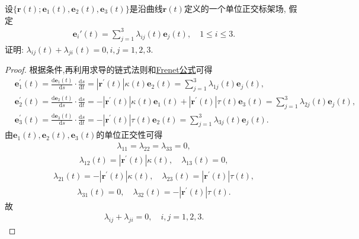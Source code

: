 \documentclass[../../main.tex]{subfiles}%
\begin{document}
\begin{example}
设$\{\bm{r}(t); \bm{e}_1(t), \bm{e}_2(t), \bm{e}_3(t)\}$是沿曲线$\bm{r}(t)$定义的一个单位正交标架场, 假定
\begin{align*}
\bm{e}_i'(t) = \sum\limits_{j=1}^{3} \lambda_{ij}(t) \bm{e}_j(t),\quad 1 \leqslant i \leqslant 3.
\end{align*}
证明: $\lambda_{ij}(t) + \lambda_{ji}(t) = 0, i,j = 1,2,3.$
\end{example}
\begin{proof}

根据条件,再利用求导的链式法则和\hyperref[theorem:微分几何-Frenet公式]{Frenet公式}可得
\begin{align*}
&\bm{e}_{1}^{\prime}\left( t \right) =\frac{\mathrm{d}\bm{e}_1\left( t \right)}{\mathrm{d}s}\cdot \frac{\mathrm{d}s}{\mathrm{d}t}=\left| \bm{r}^\prime \left( t \right) \right|\kappa \left( t \right) \bm{e}_2\left( t \right) =\sum_{j=1}^3{\lambda _{1j}\left( t \right) \bm{e}_j\left( t \right)},
\\
&\bm{e}_{2}^{\prime}\left( t \right) =\frac{\mathrm{d}\bm{e}_2\left( t \right)}{\mathrm{d}s}\cdot \frac{\mathrm{d}s}{\mathrm{d}t}=-\left| \bm{r}^\prime \left( t \right) \right|\kappa \left( t \right) \bm{e}_1\left( t \right) +\left| \bm{r}^\prime \left( t \right) \right|\tau \left( t \right) \bm{e}_3\left( t \right) =\sum_{j=1}^3{\lambda _{2j}\left( t \right) \bm{e}_j\left( t \right)},
\\
&\bm{e}_{3}^{\prime}\left( t \right) =\frac{\mathrm{d}\bm{e}_3\left( t \right)}{\mathrm{d}s}\cdot \frac{\mathrm{d}s}{\mathrm{d}t}=-\left| \bm{r}^\prime \left( t \right) \right|\tau \left( t \right) \bm{e}_2\left( t \right) =\sum_{j=1}^3{\lambda _{3j}\left( t \right) \bm{e}_j\left( t \right)}.
\end{align*}
由$\bm{e}_1\left( t \right) ,\bm{e}_2\left( t \right) ,\bm{e}_3\left( t \right)$的单位正交性可得
\begin{align*}
\lambda_{11}=\lambda_{22}=\lambda_{33}=0,
\end{align*}
\begin{align*}
\lambda _{12}\left( t \right) =\left| \bm{r}^\prime \left( t \right) \right|\kappa \left( t \right) ,\quad \lambda _{13}\left( t \right) =0,
\end{align*}
\begin{align*}
\lambda _{21}\left( t \right) =-\left| \bm{r}^\prime \left( t \right) \right|\kappa \left( t \right) ,\quad \lambda _{23}\left( t \right) =\left| \bm{r}^\prime \left( t \right) \right|\tau \left( t \right) ,
\end{align*}
\begin{align*}
\lambda _{31}\left( t \right) =0,\quad \lambda _{32}\left( t \right) =-\left| \bm{r}^\prime \left( t \right) \right|\tau \left( t \right) .
\end{align*}
故
\begin{align*}
\lambda _{ij}+\lambda _{ji}=0,\quad i,j=1,2,3.
\end{align*}

\end{proof}
\end{document}
